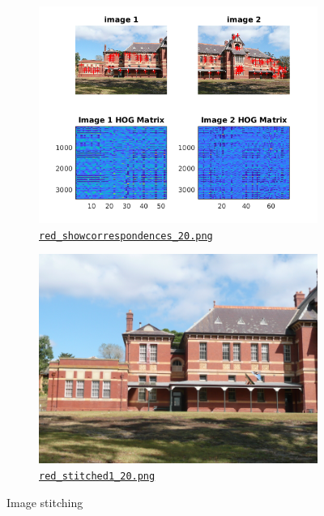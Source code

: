 \begin{figure}[htbp]
\begin{subfigure}[t]{0.4\textwidth}
		\includegraphics[width=\textwidth]{hw2/problem3/red_showcorrespondences_20.png}
		\caption{\href{./hw2/problem3/red_showcorrespondences_20.png}{\texttt{red\_showcorrespondences\_20.png}}}\label{fig:8e}
	\end{subfigure}
	\qquad
	\begin{subfigure}[t]{0.4\textwidth}
	    \centering
		\includegraphics[width=\textwidth]{hw2/problem3/red_stitched1_20.png}
		\caption{\href{./hw2/problem3/red_stitched1_20.png}{\texttt{red\_stitched1\_20.png}}}\label{fig:8f}
	\end{subfigure}
	\caption{Image stitching}\label{fig:8}
\end{figure}


